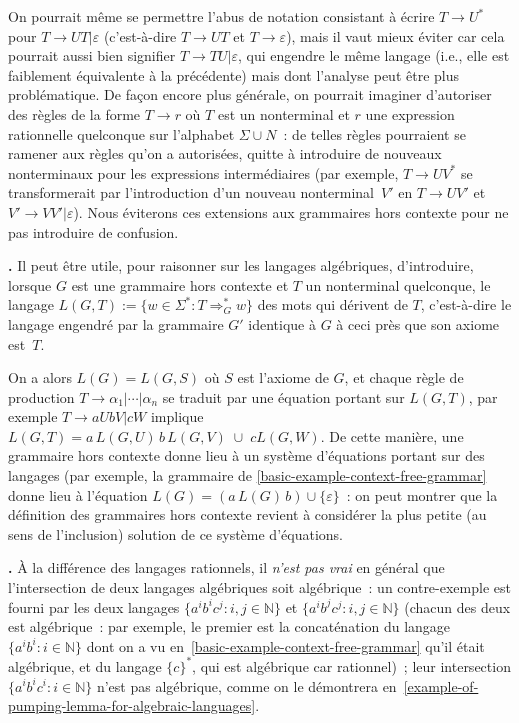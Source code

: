 \documentclass[12pt,a4paper]{article}
\theoremstyle{definition}
\newcommand\thingy{%
\refstepcounter{comcnt}\medskip\noindent\textbf{\thecomcnt.} }
\begin{document}
{\footnotesize
On pourrait même se permettre l'abus de notation consistant à écrire
$T \rightarrow U^*$ pour $T \rightarrow UT|\varepsilon$ (c'est-à-dire
$T \rightarrow UT$ et $T \rightarrow \varepsilon$), mais il vaut mieux
éviter car cela pourrait aussi bien signifier $T \rightarrow
TU|\varepsilon$, qui engendre le même langage (i.e., elle est
faiblement équivalente à la précédente) mais dont l'analyse peut être
plus problématique.  De façon encore plus générale, on pourrait
imaginer d'autoriser des règles de la forme $T \rightarrow r$ où $T$
est un nonterminal et $r$ une expression rationnelle quelconque sur
l'alphabet $\Sigma \cup N$ : de telles règles pourraient se ramener
aux règles qu'on a autorisées, quitte à introduire de nouveaux
nonterminaux pour les expressions intermédiaires (par exemple, $T
\rightarrow UV^*$ se transformerait par l'introduction d'un nouveau
nonterminal $V'$ en $T \rightarrow UV'$ et $V' \rightarrow
VV'|\varepsilon$).  Nous éviterons ces extensions aux grammaires hors
contexte pour ne pas introduire de confusion.
\par}

\thingy\label{words-deriving-from-another-nonterminal} Il peut être
utile, pour raisonner sur les langages algébriques, d'introduire,
lorsque $G$ est une grammaire hors contexte et $T$ un nonterminal
quelconque, le langage $L(G,T) := \{w \in \Sigma^* : T
\mathrel{\Rightarrow^*_G} w\}$ des mots qui dérivent de $T$,
c'est-à-dire le langage engendré par la grammaire $G'$ identique à $G$
à ceci près que son axiome est $T$.

{\footnotesize
On a alors $L(G) = L(G,S)$ où $S$ est l'axiome de $G$, et chaque règle
de production $T \rightarrow \alpha_1 | \cdots | \alpha_n$ se traduit
par une équation portant sur $L(G,T)$, par exemple $T \rightarrow aUbV
| cW$ implique $L(G,T) = a\, L(G,U)\, b\, L(G,V) \; \cup \; c L(G,W)$.
De cette manière, une grammaire hors contexte donne lieu à un système
d'équations portant sur des langages (par exemple, la grammaire de
\ref{basic-example-context-free-grammar} donne lieu à l'équation $L(G)
= (a\,L(G)\,b) \cup \{\varepsilon\}$ : on peut montrer que la
définition des grammaires hors contexte revient à considérer la plus
petite (au sens de l'inclusion) solution de ce système d'équations.
\par}

\bigbreak

\thingy À la différence des langages rationnels, il \emph{n'est pas
  vrai} en général que l'intersection de deux langages algébriques
soit algébrique : un contre-exemple est fourni par les deux langages
$\{a^i b^i c^j : i,j\in\mathbb{N}\}$ et $\{a^i b^j c^j :
i,j\in\mathbb{N}\}$ (chacun des deux est algébrique : par exemple, le
premier est la concaténation du langage $\{a^i b^i : i\in\mathbb{N}\}$
dont on a vu en \ref{basic-example-context-free-grammar} qu'il était
algébrique, et du langage $\{c\}^*$, qui est algébrique car
rationnel) ; leur intersection $\{a^i b^i c^i : i\in\mathbb{N}\}$
n'est pas algébrique, comme on le démontrera
en \ref{example-of-pumping-lemma-for-algebraic-languages}.
\end{document}
